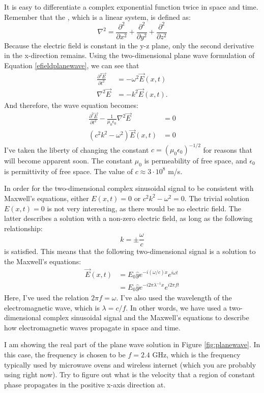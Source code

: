 It is easy to differentiate a complex exponential function twice in space and time. Remember that the , which is a linear system, is defined as:
\begin{equation}
\nabla^2 = \frac{\partial^2}{\partial x^2} + \frac{\partial^2}{\partial y^2} +\frac{\partial^2}{\partial z^2} 
\end{equation}
Because the electric field is constant in the y-z plane, only the second derivative in the x-direction remains. Using the two-dimensional plane wave formulation of Equation \ref{efieldplanewave}, we can see that
\begin{align}
\frac{\partial ^2 \vec{E}}{\partial t^2} &= -\omega^2 \vec{E}(x,t) \\
\nabla^2 \vec{E} &= -k^2 \vec{E}(x,t).
\end{align}
And therefore, the wave equation becomes:
\begin{align}
\frac{\partial^2 \vec{E}}{\partial t^2} - \frac{1}{\mu_0 \epsilon_0} \nabla^2 \vec{E} &= 0 \\
(c^2k^2-\omega^2) \vec{E}(x,t) &= 0 \label{eq:disp_relation}
\end{align}
I've taken the liberty of changing the constant $c = (\mu_0\epsilon_0)^{-1/2}$ for reasons that will become apparent soon. 
The constant $\mu_0$ is permeability of free space, and $\epsilon_0$ is permittivity of free space. The value of $c \approx 3\cdot 10^{8}$ m/s.

In order for the two-dimensional complex sinusoidal signal to be consistent with Maxwell's equations, either $E(x,t)=0$ or $c^2k^2-\omega^2 = 0$. 
The trivial solution $E(x,t)=0$ is not very interesting, as there would be no electric field. The latter describes a solution with a non-zero electric field, as long as the following relationship:
\begin{equation}
k = \pm \frac{\omega}{c}
\end{equation}
is satisfied. This means that the following two-dimensional signal is a solution to the Maxwell's equations:
\begin{align}
\vec{E}(x,t) &= E_0 \hat{y} e^{-i (\omega/c) x} e^{i\omega t} \\
             &= E_0 \hat{y} e^{-i 2\pi \lambda^{-1} x} e^{i 2\pi f t} 
\end{align}
Here, I've used the relation $2\pi f = \omega$. I've also used the wavelength of the electromagnetic wave, which is $\lambda = c/f$. 
In other words, we have used a two-dimensional complex sinusoidal signal and the Maxwell's equations to describe how electromagnetic waves propagate in space and time.

I am showing the real part of the plane wave solution in
Figure \ref{fig:planewave}. In this case, the frequency is chosen to
be $f=2.4$ GHz, which is the frequency typically used by microwave
ovens and wireless internet (which you are probably using right
now). Try to figure out what is the velocity that a region of constant
phase propagates in the positive x-axis direction at.



